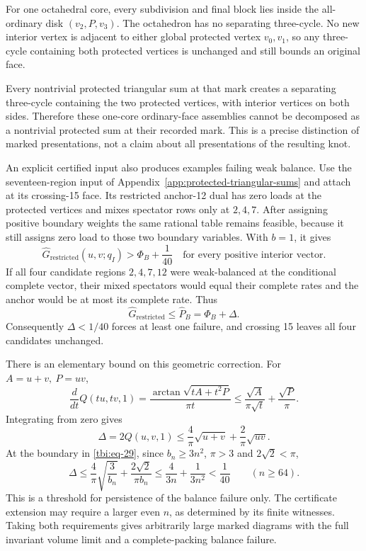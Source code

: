 For one octahedral core, every subdivision and final block lies inside the all-ordinary disk \((v_2,P,v_3)\). The octahedron has no separating three-cycle. No new interior vertex is adjacent to either global protected vertex \(v_0,v_1\), so any three-cycle containing both protected vertices is unchanged and still bounds an original face.

Every nontrivial protected triangular sum at that mark creates a separating three-cycle containing the two protected vertices, with interior vertices on both sides. Therefore these one-core ordinary-face assemblies cannot be decomposed as a nontrivial protected sum at their recorded mark. This is a precise distinction of marked presentations, not a claim about all presentations of the resulting knot.

An explicit certified input also produces examples failing weak balance. Use the seventeen-region input of Appendix~\ref{app:protected-triangular-sums} and attach at its crossing-15 face. Its restricted anchor-12 dual has zero loads at the protected vertices and mixes spectator rows only at \(2,4,7\). After assigning positive boundary weights the same rational table remains feasible, because it still assigns zero load to those two boundary variables. With \(b=1\), it gives
\begin{equation}\label{tbi:eq-30}
\widehat G_{\mathrm{restricted}}(u,v;q_I)>
\Phi_B+\frac1{40}
\quad\text{for every positive interior vector}.
\end{equation}
If all four candidate regions \(2,4,7,12\) were weak-balanced at the conditional complete vector, their mixed spectators would equal their complete rates and the anchor would be at most its complete rate. Thus
\begin{equation}\label{tbi:eq-31}
\widehat G_{\mathrm{restricted}}\le
\widehat P_B=\Phi_B+\Delta.
\end{equation}
Consequently \(\Delta<1/40\) forces at least one failure, and crossing 15 leaves all four candidates unchanged.

There is an elementary bound on this geometric correction. For \(A=u+v,\ P=uv\),
\begin{equation}\label{tbi:eq-32}
\frac{d}{dt}Q(tu,tv,1)
=\frac{\arctan\sqrt{tA+t^2P}}{\pi t}
\le\frac{\sqrt A}{\pi\sqrt t}+\frac{\sqrt P}{\pi}.
\end{equation}
Integrating from zero gives
\begin{equation}\label{tbi:eq-33}
\Delta=2Q(u,v,1)\le\frac4\pi\sqrt{u+v}+
\frac2\pi\sqrt{uv}.
\end{equation}
At the boundary in \eqref{tbi:eq-29}, since \(b_n\ge3n^2\), \(\pi>3\) and \(2\sqrt2<\pi\),
\begin{equation}\label{tbi:eq-34}
\Delta\le\frac4\pi\sqrt{\frac3{b_n}}
+\frac{2\sqrt2}{\pi b_n}
\le\frac4{3n}+\frac1{3n^2}<\frac1{40}
\qquad(n\ge64).
\end{equation}
This is a threshold for persistence of the balance failure only. The certificate extension may require a larger even \(n\), as determined by its finite witnesses. Taking both requirements gives arbitrarily large marked diagrams with the full invariant volume limit and a complete-packing balance failure.

